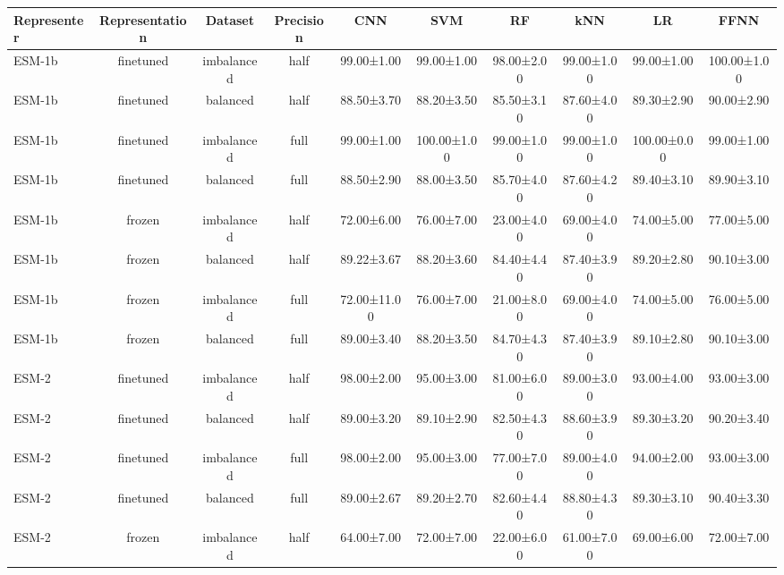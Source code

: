 \begin{tabular}{lccccccccc}
\toprule
 \textbf{Representer} & \textbf{Representation} &    \textbf{Dataset} & \textbf{Precision} &         \textbf{CNN} &         \textbf{SVM} &         \textbf{RF} &        \textbf{kNN} &          \textbf{LR} &        \textbf{FFNN} \\
\midrule
      ESM-1b &      finetuned & imbalanced &      half &  99.00±1.00 &  99.00±1.00 & 98.00±2.00 & 99.00±1.00 &  99.00±1.00 & 100.00±1.00 \\
      ESM-1b &      finetuned &   balanced &      half &  88.50±3.70 &  88.20±3.50 & 85.50±3.10 & 87.60±4.00 &  89.30±2.90 &  90.00±2.90 \\
      ESM-1b &      finetuned & imbalanced &      full &  99.00±1.00 & 100.00±1.00 & 99.00±1.00 & 99.00±1.00 & 100.00±0.00 &  99.00±1.00 \\
      ESM-1b &      finetuned &   balanced &      full &  88.50±2.90 &  88.00±3.50 & 85.70±4.00 & 87.60±4.20 &  89.40±3.10 &  89.90±3.10 \\
      ESM-1b &         frozen & imbalanced &      half &  72.00±6.00 &  76.00±7.00 & 23.00±4.00 & 69.00±4.00 &  74.00±5.00 &  77.00±5.00 \\
      ESM-1b &         frozen &   balanced &      half &  89.22±3.67 &  88.20±3.60 & 84.40±4.40 & 87.40±3.90 &  89.20±2.80 &  90.10±3.00 \\
      ESM-1b &         frozen & imbalanced &      full & 72.00±11.00 &  76.00±7.00 & 21.00±8.00 & 69.00±4.00 &  74.00±5.00 &  76.00±5.00 \\
      ESM-1b &         frozen &   balanced &      full &  89.00±3.40 &  88.20±3.50 & 84.70±4.30 & 87.40±3.90 &  89.10±2.80 &  90.10±3.00 \\
       ESM-2 &      finetuned & imbalanced &      half &  98.00±2.00 &  95.00±3.00 & 81.00±6.00 & 89.00±3.00 &  93.00±4.00 &  93.00±3.00 \\
       ESM-2 &      finetuned &   balanced &      half &  89.00±3.20 &  89.10±2.90 & 82.50±4.30 & 88.60±3.90 &  89.30±3.20 &  90.20±3.40 \\
       ESM-2 &      finetuned & imbalanced &      full &  98.00±2.00 &  95.00±3.00 & 77.00±7.00 & 89.00±4.00 &  94.00±2.00 &  93.00±3.00 \\
       ESM-2 &      finetuned &   balanced &      full &  89.00±2.67 &  89.20±2.70 & 82.60±4.40 & 88.80±4.30 &  89.30±3.10 &  90.40±3.30 \\
       ESM-2 &         frozen & imbalanced &      half &  64.00±7.00 &  72.00±7.00 & 22.00±6.00 & 61.00±7.00 &  69.00±6.00 &  72.00±7.00 \\

\end{tabular}
